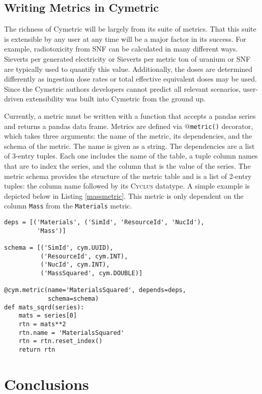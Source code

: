 \documentclass{anstrans}
\newcommand{\cyclus}{\textsc{Cyclus}\xspace}
\newcommand{\code}[1]{{\color{code}\texttt{#1}}}
\begin{document}
\subsection{Writing Metrics in Cymetric}
The richness of Cymetric will be largely from its suite of metrics. 
That this suite is extensible by any user at any time will be a major 
factor in its success. For example, radiotoxicity from \gls{SNF} can 
be calculated in many different ways. Sieverts per generated electricity 
or Sieverts per metric ton of uranium or \gls{SNF} are typically used to 
quantify this value. Additionally, the doses are determined differently as 
ingestion dose rates or total effective equivalent doses may be used. 
Since the Cymetric authors developers cannot predict all relevant scenarios, 
user-driven extensibility was built into Cymetric from the ground up. 

Currently, a metric must be written with a function that accepts a pandas 
series and returns a pandas data frame. Metrics are defined via 
\code{$@$metric()} decorator, which takes three arguments: the name of the 
metric, its dependencies, and the schema of the metric. 
The name is given as a string. The dependencies are a list of 3-entry tuples. 
Each one includes the name of the table, a tuple column names that are to 
index the series, and the column that is the value of the series. 
The metric schema provides the structure of the metric table and is a 
list of 2-entry tuples: the column name followed by its \cyclus datatype. 
A simple example is depicted below in Listing \ref{massmetric}. This metric 
is only dependent on the column \code{Mass} from the \code{Materials} metric. 

\begin{lstlisting}[caption ={Writing a Metric in Cymetric}, label=massmetric]
deps = [('Materials', ('SimId', 'ResourceId', 'NucId'), 
         'Mass')]

schema = [('SimId', cym.UUID), 
          ('ResourceId', cym.INT),
          ('NucId', cym.INT),  
          ('MassSquared', cym.DOUBLE)]

@cym.metric(name='MaterialsSquared', depends=deps, 
            schema=schema)
def mats_sqrd(series):
    mats = series[0]
    rtn = mats**2
    rtn.name = 'MaterialsSquared'
    rtn = rtn.reset_index()
    return rtn
\end{lstlisting}


\section{Conclusions}
\end{document}
